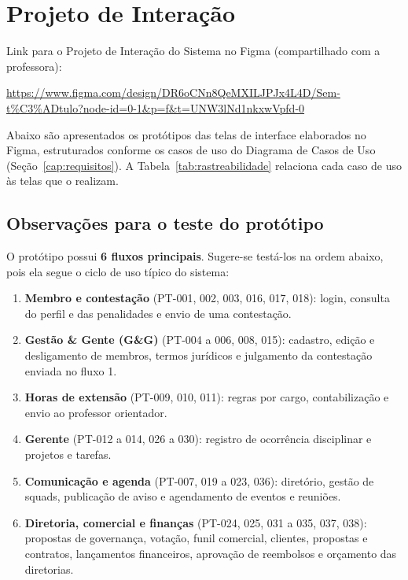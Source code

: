 \chapter{Projeto de Interação}
\label{cap:interacao}

Link para o Projeto de Interação do Sistema no Figma (compartilhado com a professora):

\noindent\url{https://www.figma.com/design/DR6oCNn8QeMXILJPJx4L4D/Sem-t%C3%ADtulo?node-id=0-1&p=f&t=UNW3lNd1nkxwVpfd-0}

Abaixo são apresentados os protótipos das telas de interface elaborados no Figma, estruturados conforme os casos de uso do Diagrama de Casos de Uso (Seção~\ref{cap:requisitos}). A Tabela~\ref{tab:rastreabilidade} relaciona cada caso de uso às telas que o realizam.

\section{Observações para o teste do protótipo}

O protótipo possui \textbf{6 fluxos principais}. Sugere-se testá-los na ordem abaixo, pois ela segue o ciclo de uso típico do sistema:

\begin{enumerate}
    \item \textbf{Membro e contestação} (PT-001, 002, 003, 016, 017, 018): login, consulta do perfil e das penalidades e envio de uma contestação.
    \item \textbf{Gestão \& Gente (G\&G)} (PT-004 a 006, 008, 015): cadastro, edição e desligamento de membros, termos jurídicos e julgamento da contestação enviada no fluxo 1.
    \item \textbf{Horas de extensão} (PT-009, 010, 011): regras por cargo, contabilização e envio ao professor orientador.
    \item \textbf{Gerente} (PT-012 a 014, 026 a 030): registro de ocorrência disciplinar e projetos e tarefas.
    \item \textbf{Comunicação e agenda} (PT-007, 019 a 023, 036): diretório, gestão de squads, publicação de aviso e agendamento de eventos e reuniões.
    \item \textbf{Diretoria, comercial e finanças} (PT-024, 025, 031 a 035, 037, 038): propostas de governança, votação, funil comercial, clientes, propostas e contratos, lançamentos financeiros, aprovação de reembolsos e orçamento das diretorias.
\end{enumerate}


